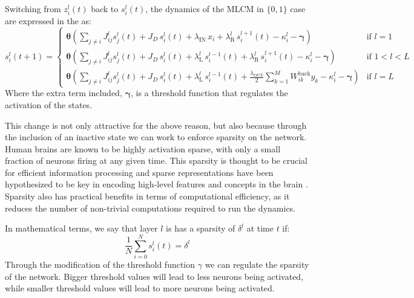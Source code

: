 \documentclass[a4paper,12pt]{report}
\begin{document}
Switching from $z_i^l(t)$ back to $s_i^l(t)$, the dynamics of the MLCM in $\{0, 1\}$ 
case are expressed in the as:
\begin{equation}
    s_i^l(t+1) = 
    \begin{cases}
        \boldsymbol{\theta}\left(\displaystyle\sum_{j \neq i} J_{ij}^l s_j^l(t) + 
        J_D\, s_i^l(t) + \lambda_{\mathrm{IN}}\, x_i + \lambda_{\mathrm{R}}^l \, 
        s_i^{l+1}(t) - \kappa_i^l - \boldsymbol{\gamma}
        \right) & \text{if } l = 1 \\[2ex]
        \boldsymbol{\theta}\left(\displaystyle\sum_{j \neq i} J_{ij}^l s_j^l(t) + 
        J_D\, s_i^l(t) + \lambda_{\mathrm{L}}^l\, s_i^{l-1}(t) + 
        \lambda_{\mathrm{R}}^l\, s_i^{l+1}(t)  - \kappa_i^l - \boldsymbol{\gamma}
        \right) & \text{if } 1 < l < L \\[2ex]
        \boldsymbol{\theta}\left(\displaystyle\sum_{j \neq i} J_{ij}^l s_j^l(t) + 
        J_D\, s_i^l(t) + \lambda_{\mathrm{L}}^l\, s_i^{l-1}(t) +
        \frac{\lambda_{\mathrm{OUT}}}{2} \sum_{k=1}^{M} W_{ik}^{\mathrm{back}} y_k  - 
        \kappa_i^l - \boldsymbol{\gamma}\right) 
        & \text{if } l = L
    \end{cases}
    \label{eq:si_sparse_update}
\end{equation}
Where the extra term included, $\boldsymbol{\gamma}$, is a threshold function 
that regulates the activation of the states.
\vspace*{0.5em}

This change is not only attractive for the above reason, but also because through the 
inclusion of an inactive state we can work to enforce sparsity on the network. Human 
brains are known to be highly activation sparse, with only a small fraction of neurons 
firing at any given time. This sparsity is thought to be crucial for efficient 
information processing and sparse representations have been hypothesized to be key in 
encoding high-level features and concepts in the brain \cite{JAASKELAINEN2022119633}.\\
Sparsity also has practical benefits in terms of computational efficiency, as it 
reduces the number of non-trivial computations required to run the dynamics.
\vspace*{0.5em}

In mathematical terms, we say that layer $l$ is has a sparsity of $\delta^l$ at time 
$t$ if: 
$$\frac{1}{N} \sum_{i=0}^{N} s_i^l(t) = \delta^l$$
Through the modification of the threshold function $\gamma$ we can regulate the 
sparsity of the network. Bigger threshold values will lead to less neurons being activated,
while smaller threshold values will lead to more neurons being activated.
\vspace*{0.5em}
\end{document}
